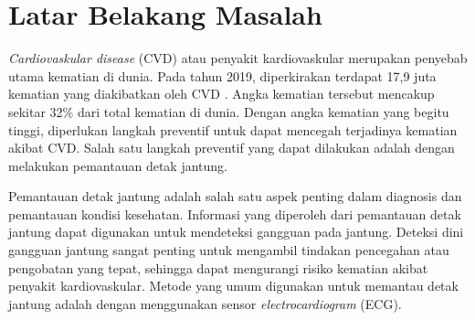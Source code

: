 
\section{Latar Belakang Masalah}

\emph{Cardiovaskular disease} (CVD) atau penyakit kardiovaskular merupakan penyebab utama kematian di dunia.
Pada tahun 2019, diperkirakan terdapat 17,9 juta kematian yang diakibatkan oleh CVD \parencite{worldhealthorganizationCardiovascularDiseasesCVDs2021}.
Angka kematian tersebut mencakup sekitar 32\% dari total kematian di dunia. 
Dengan angka kematian yang begitu tinggi, diperlukan langkah preventif untuk dapat mencegah terjadinya kematian akibat CVD.
Salah satu langkah preventif yang dapat dilakukan adalah dengan melakukan pemantauan detak jantung.


Pemantauan detak jantung adalah salah satu aspek penting dalam diagnosis dan pemantauan kondisi kesehatan.
Informasi yang diperoleh dari pemantauan detak jantung dapat digunakan untuk mendeteksi gangguan pada jantung.
Deteksi dini gangguan jantung sangat penting untuk mengambil tindakan pencegahan atau pengobatan yang tepat, sehingga dapat mengurangi risiko kematian akibat penyakit kardiovaskular.
Metode yang umum digunakan untuk memantau detak jantung adalah dengan menggunakan sensor \emph{electrocardiogram} (ECG).


